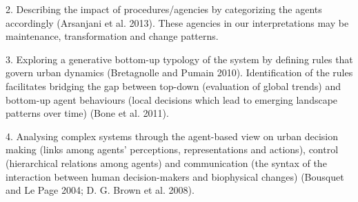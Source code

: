 \documentclass[11pt]{report}
\begin{document}
2.	Describing the impact of procedures/agencies by categorizing the agents accordingly (Arsanjani et al. 2013). These agencies in our interpretations may be maintenance, transformation and change patterns.

3.	Exploring a generative bottom-up typology of the system by defining rules that govern urban dynamics (Bretagnolle and Pumain 2010). Identification of the rules facilitates bridging the gap between top-down (evaluation of global trends) and bottom-up agent behaviours (local decisions which lead to emerging landscape patterns over time) (Bone et al. 2011). 

4.	Analysing complex systems through the agent-based view on urban decision making (links among agents' perceptions, representations and actions), control (hierarchical relations among agents) and communication (the syntax of the interaction between human decision-makers and biophysical changes) (Bousquet and Le Page 2004; D. G. Brown et al. 2008).
\end{document}
